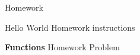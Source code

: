 \documentclass[a4paper]{article}
\begin{document}
\newpage
\begin{exam}[Homework]{Homework}
  \begin{instructions}
    Hello World Homework instructions
  \end{instructions}

  \begin{problem}[3]{\textbf{Functions}}
    Homework Problem
  \end{problem}
\end{exam}
\end{document}
